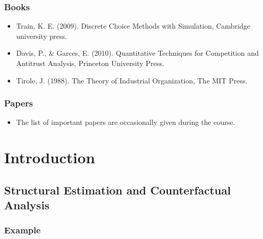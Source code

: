 \documentclass[
]{book}
\providecommand{\tightlist}{%
  \setlength{\itemsep}{0pt}\setlength{\parskip}{0pt}}
\begin{document}
\hypertarget{books}{%
\subsection{Books}\label{books}}

\begin{itemize}
\tightlist
\item
  Train, K. E. (2009). Discrete Choice Methods with Simulation, Cambridge university press.
\item
  Davis, P., \& Garces, E. (2010). Quantitative Techniques for Competition and Antitrust Analysis, Princeton University Press.
\item
  Tirole, J. (1988). The Theory of Industrial Organization, The MIT Press.
\end{itemize}

\hypertarget{papers}{%
\subsection{Papers}\label{papers}}

\begin{itemize}
\tightlist
\item
  The list of important papers are occasionally given during the course.
\end{itemize}

\hypertarget{intro}{%
\chapter{Introduction}\label{intro}}

\hypertarget{structural-estimation-and-counterfactual-analysis}{%
\section{Structural Estimation and Counterfactual Analysis}\label{structural-estimation-and-counterfactual-analysis}}

\hypertarget{example}{%
\subsection{Example}\label{example}}
\end{document}
